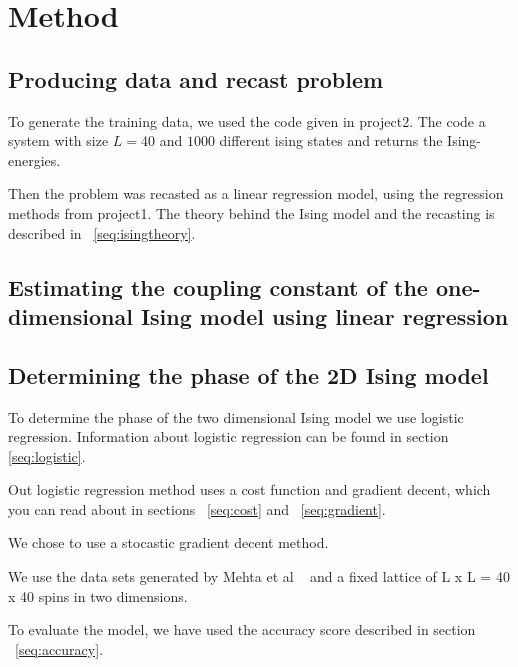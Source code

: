 \section{Method}

\subsection{Producing data and recast problem}
To generate the training data, we used the code given in 
project2. 
The code a system with size \(L=40\) and \(1000\) different 
ising states and returns the Ising-energies. 

Then the problem was recasted as a linear regression model, using 
the regression methods from project1. The theory behind 
the Ising model and the recasting is described in ~\ref{seq:isingtheory}.

\subsection{Estimating the coupling constant of the one-dimensional Ising model using linear regression}

\subsection{Determining the phase of the 2D Ising model}
To determine the phase of the two dimensional Ising model we use 
logistic regression. Information about logistic regression can be found 
in section \ref{seq:logistic}. 

Out logistic regression method uses a cost function 
and gradient decent, which you can read about 
in sections ~\ref{seq:cost} and ~\ref{seq:gradient}.

We chose to use a stocastic gradient decent method. 

We use the data sets generated by Mehta et al ~\cite{HighBias}
and a fixed lattice of L x L = 40 x 40 spins in two dimensions.

To evaluate the model, we have used the accuracy score described in 
section ~\ref{seq:accuracy}. 

